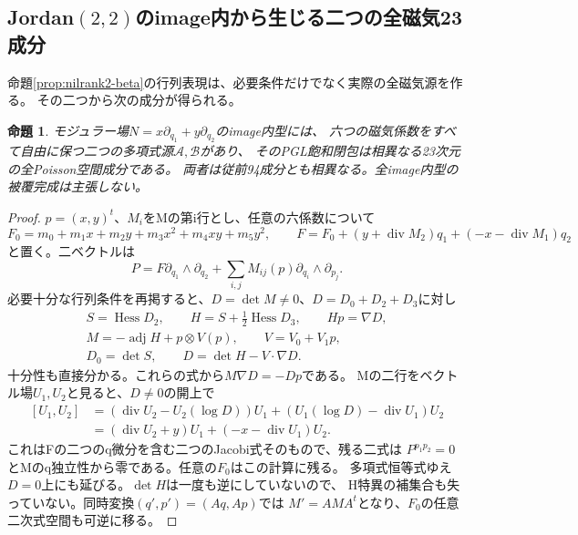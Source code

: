 \documentclass[a4paper,11pt]{ltjsarticle}
\newtheorem{proposition}{命題}[section]
\theoremstyle{definition}
\begin{document}
\subsection{Jordan$(2,2)$のimage内から生じる二つの全磁気23成分}
命題\ref{prop:nilrank2-beta}の行列表現は、必要条件だけでなく実際の全磁気源を作る。
その二つから次の成分が得られる。
\begin{proposition}\label{prop:nil22-image-two-components}
モジュラー場$N=x\partial_{q_1}+y\partial_{q_2}$のimage内型には、
六つの磁気係数をすべて自由に保つ二つの多項式源$\mathcal A,\mathcal B$があり、
そのPGL飽和閉包は相異なる23次元の全Poisson空間成分である。
両者は従前94成分とも相異なる。全image内型の被覆完成は主張しない。
\end{proposition}
\begin{proof}
$p=(x,y)^t$、$M_i$をMの第i行とし、任意の六係数について
\[
 F_0=m_0+m_1x+m_2y+m_3x^2+m_4xy+m_5y^2,
 \qquad
 F=F_0+(y+\operatorname{div}M_2)q_1+(-x-\operatorname{div}M_1)q_2
\]
と置く。二ベクトルは
\[
 P=F\partial_{q_1}\wedge\partial_{q_2}
       +\sum_{i,j}M_{ij}(p)\partial_{q_i}\wedge\partial_{p_j}.
\]
必要十分な行列条件を再掲すると、$D=\det M\ne0$、$D=D_0+D_2+D_3$に対し
\[
 \begin{gathered}
 S=\operatorname{Hess}D_2,\qquad
 H=S+\tfrac12\operatorname{Hess}D_3,\qquad Hp=\nabla D,\\
 M=-\operatorname{adj}H+p\otimes V(p),\qquad V=V_0+V_1p,\\
 D_0=\det S,\qquad D=\det H-V\cdot\nabla D.
 \end{gathered}
\]
十分性も直接分かる。これらの式から$M\nabla D=-Dp$である。
Mの二行をベクトル場$U_1,U_2$と見ると、$D\ne0$の開上で
\[
 \begin{aligned}
 [U_1,U_2]
 &=(\operatorname{div}U_2-U_2(\log D))U_1
       +(U_1(\log D)-\operatorname{div}U_1)U_2\\
 &=(\operatorname{div}U_2+y)U_1+(-x-\operatorname{div}U_1)U_2.
 \end{aligned}
\]
これはFの二つのq微分を含む二つのJacobi式そのもので、残る二式は
$P^{p_1p_2}=0$とMのq独立性から零である。任意の$F_0$はこの計算に残る。
多項式恒等式ゆえ$D=0$上にも延びる。$\det H$は一度も逆にしていないので、
H特異の補集合も失っていない。同時変換$(q',p')=(Aq,Ap)$では
$M'=AMA^t$となり、$F_0$の任意二次式空間も可逆に移る。


\end{proof}
\end{document}
